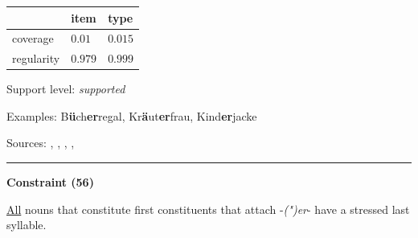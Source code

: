\vspace{-0.35em}

\begin{table}[!ht]
\begin{center}

\begin{tabularx}{\columnwidth}{|X|X|X|}
\hline
 & item & type \\
\hline
 coverage & $0.01$ & $0.015$ \\
\hline
 regularity & $0.979$ & $0.999$ \\
\hline
\end{tabularx}
\end{center}
\end{table}

\vspace{-1.35em}

\noindent
Support level: \textit{supported}

\vspace{0.3em}

\noindent
Examples: B\textbf{ü}ch\textbf{er}regal, Kr\textbf{ä}ut\textbf{er}frau, Kind\textbf{er}jacke

\vspace{0.3em}

\noindent
Sources: \citet[229]{eisenberg_2013}, \citet[9, 11, 18]{kuerschner_2010}, \citet[3]{nuebling_szczepaniak_2008}, \citet[80, 81]{nuebling_szczepaniak_2013}, \citet[98]{ortner_mueller-bollhagen_1991}


\hrule




\vspace{0.4em}

\begin{center}
\textbf{Constraint (56)}
\end{center}

\noindent
\underline{All} nouns that constitute first constituents that attach -\textit{(")er}- have a stressed last syllable.
\vspace{0.35em}


